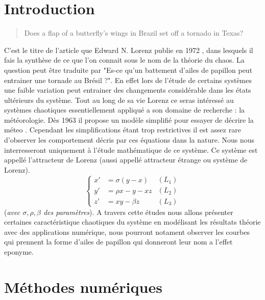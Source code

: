 \documentclass{article}
\newtheorem[M , nocut]{prop}{Proposition}[section]
\newtheorem[M]{propt}{Propriété}[section]
\newtheorem[L , nocut]{thm}{Théoreme}
\newtheorem[L]{cor}{Corollaire}
\begin{document}
\section*{Introduction}
\thispagestyle{empty}
\setcounter{page}{1}
\begin{quotation}
    Does a flap of a butterfly's wings in Brazil set off a tornado in Texas?
\end{quotation}
C'est le titre de l'article que Edward N. Lorenz publie en 1972 \cite{lorenz_does_1972}, dans lesquels il fais la synthèse de ce que l'on connait sous le nom de la théorie du chaos. La question peut être traduite par "Es-ce qu'un battement d'ailes de papillon peut entrainer une tornade au Brésil ?". En effet lors de l'étude de certains systèmes une faible variation peut entrainer des changements considérable dans les états ultérieurs du système. Tout au long de sa vie Lorenz ce seras intéressé au systèmes chaotiques essentiellement appliqué a son domaine de recherche : la météorologie. Dès 1963 il propose un modèle simplifié pour essayer de décrire la méteo \cite{lorenz1963}. Cependant les simplifications étant trop restrictives il est assez rare d'observer les comportement décris par ces équations dans la nature. Nous nous interresseront uniquement à l'étude mathématique de ce système. Ce système est appellé l'attracteur de Lorenz (aussi appellé attracteur étrange ou système de Lorenz).
\begin{equation}
    \label{Lorenz}
    \left\{
    \begin{array}{rl}
        x' &=\sigma(y-x) \\
        y' &=\rho x -y - xz\\
        z' &=xy - \beta z
    \end{array}
    \right.
    \begin{array}{r}
        (L_1)\\
        (L_2)\\
        (L_3)
    \end{array}
\end{equation}
(\textit{avec $\sigma,\rho,\beta$ des paramètres}).
A travers cette études nous allons présenter certaines caractéristique chaotiques du système en modélisant les résultats théorie avec des applications numérique, nous pourront notament observer les courbes qui prennent la forme d'ailes de papillon qui donneront leur nom a l'effet eponyme.
   
    \newpage
\section{Méthodes numériques}
\end{document}
